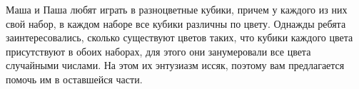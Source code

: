 Маша и Паша любят играть в разноцветные кубики, причем у каждого из них свой набор, в каждом наборе все кубики различны по цвету. Однажды ребята заинтересовались, сколько существуют цветов таких, что кубики каждого цвета присутствуют в обоих наборах, для этого они занумеровали все цвета случайными числами. На этом их энтузиазм иссяк, поэтому вам предлагается помочь им в оставшейся части.

\sxd